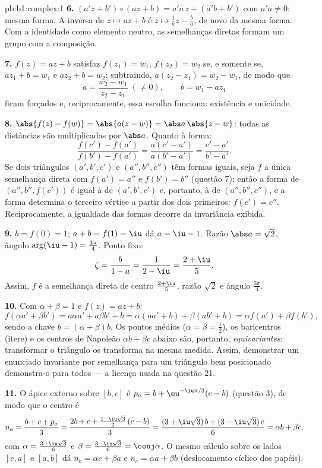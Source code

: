 \begin{solution}{pb:b1:complex:1}
\textbf{6.} $(a'z + b') \circ (az + b) = a'a\,z + (a'b + b')$ com
$a'a \neq 0$: mesma forma. A inversa de $z \mapsto az + b$ é $z
\mapsto \frac1a z - \frac ba$, de novo da mesma forma. Com a
 identidade como elemento neutro, as semelhanças diretas formam
um grupo com a composição.

\textbf{7.} $f(z) = az + b$ satisfaz $f(z_1) = w_1$, $f(z_2) =
w_2$ se, e somente se, $a z_1 + b = w_1$ e $a z_2 + b = w_2$; subtraindo,
$a(z_2 - z_1) = w_2 - w_1$, de modo que
\[
a = \frac{w_2 - w_1}{z_2 - z_1} \;(\neq 0), \qquad
b = w_1 - a z_1
\]
ficam forçados e, reciprocamente, essa escolha funciona: existência e
unicidade.

\textbf{8.} $\abs{f(z) - f(w)} = \abs{a(z - w)} = \abs a\,\abs{z -
w}$: todas as distâncias são multiplicadas por $\abs a$. Quanto à forma:
\[
\frac{f(c') - f(a')}{f(b') - f(a')} = \frac{a(c' -
a')}{a(b' - a')} = \frac{c' - a'}{b' - a'} .
\]
Se dois triângulos $(a', b', c')$ e $(a'', b'', c'')$ têm formas
iguais, seja $f$ a única semelhança direta com $f(a') = a''$
e $f(b') = b''$ (questão 7); então a forma de $(a'', b'',
f(c'))$
é igual à de $(a', b', c')$ e, portanto, à de $(a'', b'',
c'')$, e a forma determina o terceiro vértice a partir dos dois
primeiros: $f(c') = c''$. Reciprocamente, a igualdade das formas
decorre da invariância exibida.

\textbf{9.} $b = f(0) = 1$; $a + b = f(1) = \iu$ dá $a = \iu -
1$. Razão $\abs a = \sqrt2$, ângulo $\arg(\iu - 1) =
\frac{3\pi}4$. Ponto fixo:
\[
\zeta = \frac{b}{1 - a} = \frac1{2 - \iu} = \frac{2 + \iu}5 .
\]
Assim, $f$ é a semelhança direta de centro $\frac{2+\iu}5$, razão
$\sqrt2$ e ângulo $\frac{3\pi}4$.

\textbf{10.} Com $\alpha + \beta = 1$ e $f(z) = az + b$:
\[
f(\alpha a' + \beta b') = a\alpha a' + a\beta b' + b
= \alpha(a a' + b) + \beta(a b' + b)
= \alpha f(a') + \beta f(b') ,
\]
sendo a chave $b = (\alpha + \beta)b$. Os pontos médios ($\alpha = \beta =
\frac12$), os baricentros (itere) e os centros de Napoleão $\alpha b
+ \beta c$
abaixo são, portanto, \emph{equivariantes}: transformar o
triângulo os transforma na mesma medida. Assim, demonstrar um enunciado
invariante por semelhança para um triângulo bem posicionado demonstra-o
para todos --- a licença usada na questão 21.

\textbf{11.} O ápice externo sobre $[b, c]$ é $p_a = b +
\eu^{-\iu\pi/3}(c - b)$ (questão 3), de modo que o centro é
\[
n_a = \frac{b + c + p_a}3
= \frac{2b + c + \frac{1 - \iu\sqrt3}2\,(c - b)}3
= \frac{(3 + \iu\sqrt3)\,b + (3 - \iu\sqrt3)\,c}6
= \alpha b + \beta c ,
\]
com $\alpha = \frac{3 + \iu\sqrt3}6$ e $\beta = \frac{3 -
\iu\sqrt3}6 = \conj\alpha$. O mesmo cálculo sobre os lados
$[c, a]$ e $[a, b]$ dá $n_b = \alpha c + \beta a$ e $n_c =
\alpha a + \beta b$ (deslocamento cíclico dos papéis).


\end{solution}
